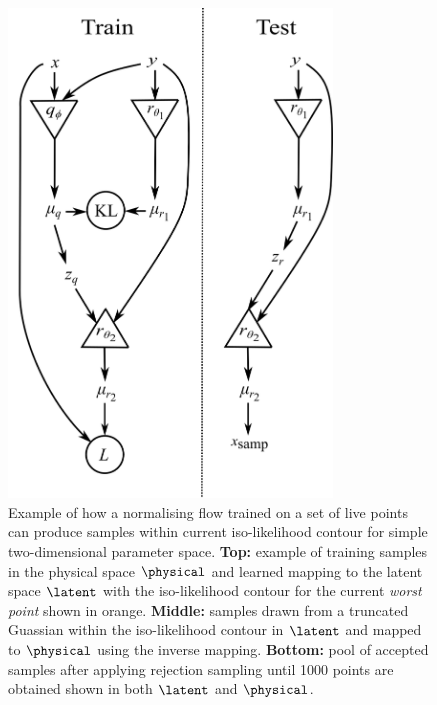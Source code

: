 \documentclass[aps,superscriptaddress,twocolumn,nopreprintnumbers,floatfix,groupedaddress]{revtex4-1}
\newcommand{\figwidth}{8.6cm}
\begin{document}
\begin{figure}
	\centering
	\includegraphics[width=\figwidth]{figs/network_setup.png}
	\caption{Example of how a normalising flow trained on a set of live points can produce samples within current iso-likelihood contour for simple two-dimensional parameter space. \textbf{Top:} example of training samples in the physical space $\physical$ and learned mapping to the latent space $\latent$ with the iso-likelihood contour for the current \textit{worst point} shown in orange. \textbf{Middle:} samples drawn from a truncated Guassian within the iso-likelihood contour in $\latent$ and mapped to $\physical$ using the inverse mapping. \textbf{Bottom:} pool of accepted samples after applying rejection sampling until 1000 points are obtained shown in both $\latent$ and $\physical$.}
	\label{fig:learning_contours}
\end{figure}
\end{document}
